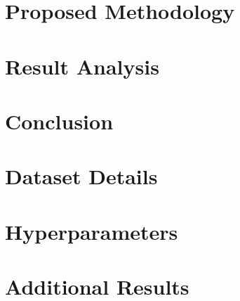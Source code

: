 \documentclass[Times,12pt,oneside,openany,print,index]{report}
\begin{document}
\chapter{Proposed Methodology}
\label{chap:methodology}


\chapter{Result Analysis}
\label{chap:results}


\chapter{Conclusion}
\label{chap:conclusion}
\label{chap:future}



\printbibliography
{}

\newpage
{}
{}
\appendix
\chapter{Dataset Details}


\newpage
{}
{}
\chapter{Hyperparameters}


\newpage
{}
{}
\chapter{Additional Results}

\end{document}
